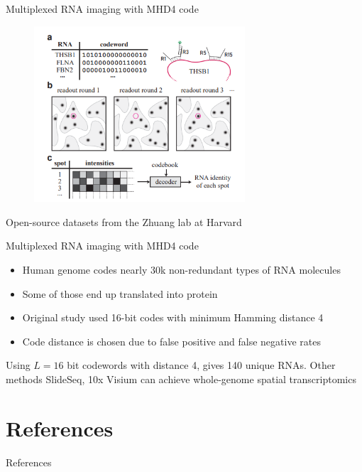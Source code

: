 \documentclass{beamer}					%
\begin{document}
\begin{frame}{Multiplexed RNA imaging with MHD4 code}

\begin{figure}
\begin{center}
\includegraphics[width=0.7\textwidth]{merfish}
\end{center}
\end{figure}

Open-source datasets from the Zhuang lab at Harvard

\end{frame}

\begin{frame}{Multiplexed RNA imaging with MHD4 code}

\begin{itemize}
\item Human genome codes nearly 30k non-redundant types of
RNA molecules
\item Some of those end up translated into protein
\item Original study used 16-bit codes with minimum Hamming distance 4
\item Code distance is chosen due to false positive and false negative rates
\end{itemize}
\vspace{0.1in}
Using $L=16$ bit codewords with distance 4, gives 140 unique RNAs. Other methods SlideSeq, 10x Visium can achieve whole-genome spatial transcriptomics

\end{frame}



\section{References}

\begin{frame}[allowframebreaks]{References}
	\tiny
	
\end{frame}
\end{document}

